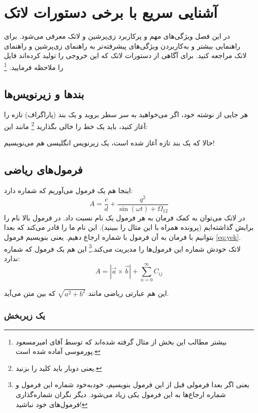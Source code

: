 
\chapter{آشنایی سریع با برخی دستورات لاتک}
\thispagestyle{fancy}\clearpage
\label{app:latexIntro}
در این فصل ویژگی‌های مهم و پرکاربرد زی‌پرشین و لاتک معرفی می‌شود. برای راهنمایی بیشتر و به‌کاربردن ویژگی‌های پیشرفته‌تر به راهنمای زی‌پرشین و راهنمای لاتک مراجعه کنید. برای آگاهی از دستورات لاتک که این خروجی را تولید کرده‌اند فایل  را ملاحظه فرمایید.
\footnote{بیشتر مطالب این بخش از مثال
	گرفته شده‌اند که توسط آقای امیرمسعود پورموسی آماده شده است.}

\section{بندها و زیرنویس‌ها}
هر جایی از نوشته خود، اگر می‌خواهید به سر سطر بروید و یک بند (پاراگراف) تازه را آغاز کنید، باید یک خط را خالی بگذارید%
\footnote{یعنی دوبار باید کلید  را بزنید.}
مانند این:

حالا که یک بند تازه آغاز شده است، یک زیرنویس انگلیسی%
هم می‌نویسیم!
\section{فرمول‌های ریاضی}
\label{formula}

اینجا هم یک فرمول می‌آوریم که شماره دارد:
\begin{equation}\label{eq:yek}
	A=\frac{c}{d}+\frac{q^2}{\sin(\omega t)+\Omega_{12}}
\end{equation}
در لاتک می‌توان به کمک فرمان
به هر فرمول یک نام نسبت داد. در فرمول بالا نام  را برایش گذاشته‌ایم (پرونده  همراه با این مثال را ببینید). این نام ما را قادر می‌کند که بعدا بتوانیم با فرمان
به آن فرمول با شماره ارجاع دهیم. یعنی بنویسیم فرمول \ref{eq:yek}.
لاتک خودش شماره این فرمول‌ها را مدیریت می‌کند.\footnote{یعنی اگر بعدا فرمولی قبل از این فرمول بنویسیم، خودبه‌خود شماره این فرمول و شماره ارجاع‌ها به این فرمول یکی زیاد می‌شود. دیگر نگران شماره‌گذاری فرمول‌های خود نباشید!} این هم یک فرمول که شماره ندارد:
$$A=|\vec{a}\times \vec{b}| + \sum_{n=0}^\infty C_{ij}$$

این هم عبارتی ریاضی مانند
$\sqrt{a^2+b^2}$
که بین متن می‌آید.
\subsection{یک زیربخش}
\label{zirbakhsh}


